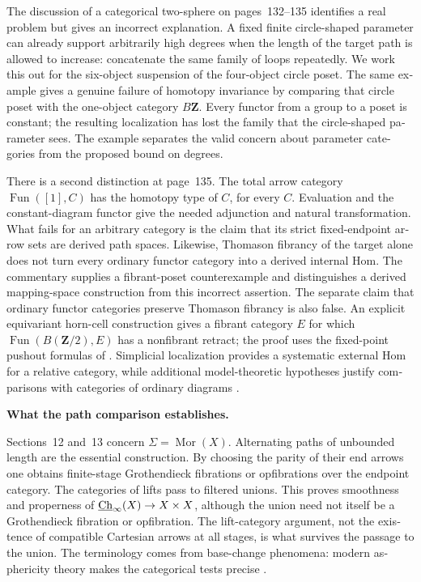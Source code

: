 \begin{otherlanguage}{english}
The discussion of a categorical two-sphere on pages~132--135 identifies a real
problem but gives an incorrect explanation.  A fixed finite circle-shaped
parameter can already support arbitrarily high degrees when the length of the
target path is allowed to increase: concatenate the same family of loops
repeatedly.  We work this out for the six-object suspension of the four-object
circle poset.  The same example gives a genuine failure of homotopy invariance
by comparing that circle poset with the one-object category $B\mathbf Z$.
Every functor from a group to a poset is constant; the resulting localization
has lost the family that the circle-shaped parameter sees.  The example
separates the valid concern about parameter categories from the proposed
bound on degrees.

There is a second distinction at page~135.  The total arrow category
$\operatorname{Fun}([1],C)$ has the homotopy type of $C$, for every $C$.
Evaluation and the constant-diagram functor give the needed adjunction and
natural transformation.  What fails for an arbitrary category is the claim
that its strict fixed-endpoint arrow sets are derived path spaces.  Likewise,
Thomason fibrancy of the target alone does not turn every ordinary functor
category into a derived internal Hom.  The commentary supplies a fibrant-poset
counterexample and distinguishes a derived mapping-space construction from
this incorrect assertion.  The separate claim that ordinary functor categories
preserve Thomason fibrancy is also false.  An explicit equivariant horn-cell
construction gives a fibrant category $E$ for which
$\operatorname{Fun}(B(\mathbf Z/2),E)$ has a nonfibrant retract; the proof uses
the fixed-point pushout formulas of
\citet[Lemmas~4.7--4.8]{MayZakharevichStephan2017}.
Simplicial localization provides a systematic
external Hom for a relative category, while additional model-theoretic
hypotheses justify comparisons with categories of ordinary diagrams
\citep{DwyerKan1980Simplicial,DwyerKan1980Calculating,Groth2013,Cisinski2009LocallyConstant,Lurie2009HTT}.

\medskip\noindent\textbf{What the path comparison establishes.}

Sections~12 and~13 concern $\Sigma=\operatorname{Mor}(X)$.  Alternating paths
of unbounded length are the essential construction.  By choosing the parity
of their end arrows one obtains finite-stage Grothendieck fibrations or
opfibrations over the endpoint category.  The categories of lifts pass to
filtered unions.  This proves smoothness and properness of
$\underline{\mathrm{Ch}}_\infty(X)\to X\times X$, although the union need not itself be a
Grothendieck fibration or opfibration.  The lift-category argument, not the
existence of compatible Cartesian arrows at all stages, is what survives the
passage to the union.  The terminology comes from base-change phenomena:
modern asphericity theory makes the categorical tests precise
\citep{Maltsiniotis2005Asphericite}.


\end{otherlanguage}
